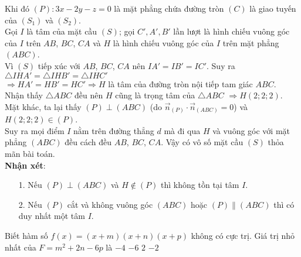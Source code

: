 \begin{ex}
{		Khi đó $(P)\colon 3x-2y-z=0$ là mặt phẳng chứa đường tròn $(C)$ là giao tuyến của $(S_1)$ và $(S_2)$.\\
		Gọi $I$ là tâm của mặt cầu $(S)$; gọi $C',A',B'$ lần lượt là hình chiếu vuông góc của $I$ trên $AB$, $BC$, $CA$ và $H$ là hình chiếu vuông góc của $I$ trên mặt phẳng $(ABC)$.\\
		Vì $(S)$ tiếp xúc với $AB$, $BC$, $CA$ nên $IA'=IB'=IC'$. Suy ra $\triangle{IHA'}=\triangle{IHB'}=\triangle{IHC'}$\\
		$\Rightarrow HA'=HB'=HC' \Rightarrow H$ là tâm của đường tròn nội tiếp tam giác $ABC$.\\
		Nhận thấy $\triangle ABC$ đều nên $H$ cũng là trọng tâm của $\triangle ABC$ $\Rightarrow H(2;2;2)$.\\
		Mặt khác, ta lại thấy $(P)\perp (ABC)$ (do $\overrightarrow{n}_{(P)}\cdot \overrightarrow{n}_{(ABC)}=0$) và $H(2;2;2)\in (P)$.\\
		Suy ra mọi điểm $I$ nằm trên đường thẳng $d$ mà đi qua $H$ và vuông góc với mặt phẳng $(ABC)$ đều cách đều $AB$, $BC$, $CA$. Vậy có vô số mặt cầu $(S)$ thỏa mãn bài toán.\\[0.3cm]
		\textbf{Nhận xét}:
		\begin{enumerate}
			\item[1.] Nếu $(P)\perp (ABC)$ và $H\notin (P)$ thì không tồn tại tâm $I$.
			\item[2.] Nếu $(P)$ cắt và không vuông góc $(ABC)$ hoặc $(P)\parallel (ABC)$ thì có duy nhất một tâm $I$.
		\end{enumerate}	
	}
\end{ex}
\begin{ex}%
	Biết hàm số $f(x)=(x+m)(x+n)(x+p)$ không có cực trị. Giá trị nhỏ nhất của $F=m^2+2n-6p$ là
	\choice
	{\True $-4$}
	{$-6$}
	{$2$}
	{$-2$}
\end{ex}
